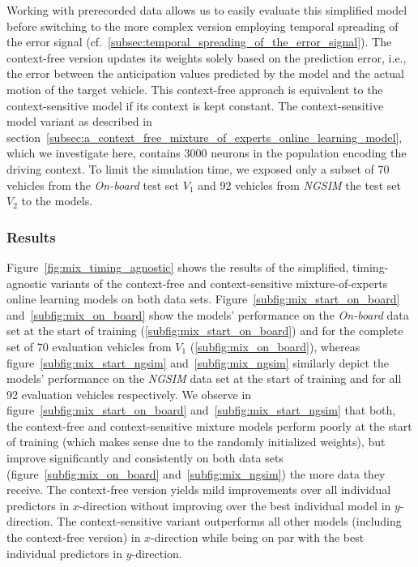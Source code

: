 Working with prerecorded data allows us to easily evaluate this simplified model before switching to the more complex version employing temporal spreading of the error signal (cf.~\ref{subsec:temporal_spreading_of_the_error_signal}).
The context-free version updates its weights solely based on the prediction error, i.e., the error between the anticipation values predicted by the model and the actual motion of the target vehicle.
This context-free approach is equivalent to the context-sensitive model if its context is kept constant.
The context-sensitive model variant as described in section~\ref{subsec:a_context_free_mixture_of_experts_online_learning_model}, which we investigate here, contains \num{3000} neurons in the population encoding the driving context.
To limit the simulation time, we exposed only a subset of \num{70} vehicles from the \emph{On-board} test set $V_1$ and \num{92} vehicles from \emph{\ac{NGSIM}} the test set $V_2$ to the models.

\subsubsection{Results}%
\label{ssubsec:results}

Figure~\ref{fig:mix_timing_agnostic} shows the results of the simplified, timing-agnostic variants of the context-free and context-sensitive mixture-of-experts online learning models on both data sets. 
Figure~\ref{subfig:mix_start_on_board} and~\ref{subfig:mix_on_board} show the models' performance on the \emph{On-board} data set at the start of training (\ref{subfig:mix_start_on_board}) and for the complete set of \num{70} evaluation vehicles from $V_1$ (\ref{subfig:mix_on_board}), whereas figure~\ref{subfig:mix_start_ngsim} and~\ref{subfig:mix_ngsim} similarly depict the models' performance on the \emph{\ac{NGSIM}} data set at the start of training and for all \num{92} evaluation
vehicles respectively.
We observe in figure~\ref{subfig:mix_start_on_board} and~\ref{subfig:mix_start_ngsim} that both, the context-free and context-sensitive mixture models perform poorly at the start of training (which makes sense due to the randomly initialized weights), but improve significantly and consistently on both data sets (figure~\ref{subfig:mix_on_board} and~\ref{subfig:mix_ngsim}) the more data they receive.
The context-free version yields mild improvements over all individual predictors in $x$-direction without improving over the best individual model in $y$-direction.
The context-sensitive variant outperforms all other models (including the context-free version) in $x$-direction while being on par with the best individual predictors in $y$-direction.

